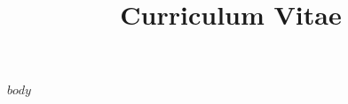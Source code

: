\documentclass[letter,11pt,english]{curve}
\title{Curriculum Vitae}
\begin{document}
\makeheaders[c]

$body$
\end{document}
